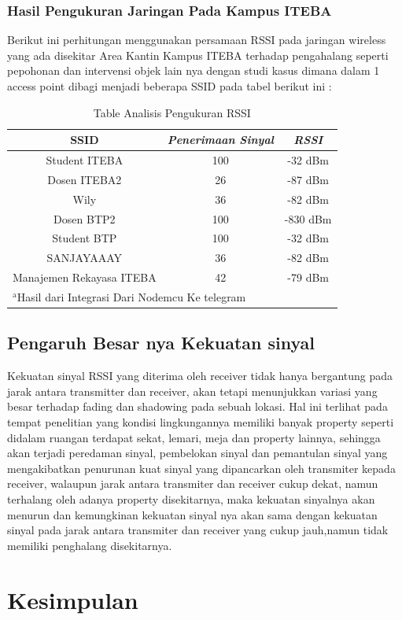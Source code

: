 \documentclass[conference]{IEEEtran}
\begin{document}
    \subsubsection{Hasil Pengukuran Jaringan Pada Kampus ITEBA}
    Berikut ini perhitungan menggunakan persamaan RSSI 
pada jaringan wireless yang ada disekitar Area Kantin Kampus ITEBA 
 terhadap pengahalang seperti pepohonan dan intervensi objek lain nya dengan studi kasus dimana dalam 1 access
 point dibagi menjadi beberapa SSID pada tabel berikut ini : 

 \begin{table}[htbp]
    \caption{Table Analisis Pengukuran RSSI}
    \begin{center}
    \begin{tabular}{|c|c|c|}
        \hline
    \textbf{SSID} &  \textbf{\textit{Penerimaan Sinyal}}& \textbf{\textit{RSSI}} \\
    \hline
    Student ITEBA & 100 & -32 dBm   \\
    \hline
    Dosen ITEBA2 & 26 & -87 dBm   \\
    \hline
    Wily & 36 & -82 dBm   \\
    \hline
    Dosen BTP2  & 100 & -830 dBm   \\
    \hline
    Student BTP  & 100 & -32 dBm   \\
    \hline
    SANJAYAAAY   & 36 & -82 dBm   \\
    \hline
    Manajemen Rekayasa ITEBA  & 42 & -79 dBm   \\
    \hline

    \multicolumn{3}{l}{$^{\mathrm{a}}$Hasil dari Integrasi Dari Nodemcu Ke telegram}
    \end{tabular}
    \label{tab1}
    \end{center}
    \end{table}


\subsection{Pengaruh Besar nya Kekuatan sinyal}
Kekuatan sinyal RSSI yang diterima oleh
receiver tidak hanya bergantung pada jarak
antara transmitter dan receiver, akan tetapi
menunjukkan variasi yang besar terhadap fading
dan shadowing pada sebuah lokasi. Hal ini
terlihat pada tempat penelitian yang kondisi
lingkungannya memiliki banyak property seperti
didalam ruangan terdapat sekat, lemari, meja dan
property lainnya, sehingga akan terjadi peredaman sinyal, 
pembelokan sinyal dan pemantulan
sinyal yang mengakibatkan penurunan kuat
sinyal yang dipancarkan oleh transmiter kepada
receiver, walaupun jarak antara transmiter dan
receiver cukup dekat, namun terhalang oleh
adanya property disekitarnya, maka kekuatan
sinyalnya akan menurun dan kemungkinan
kekuatan sinyal nya akan sama dengan kekuatan
sinyal pada jarak antara transmiter dan receiver
yang cukup jauh,namun tidak memiliki
penghalang disekitarnya.

\section{Kesimpulan}

% 
% 
\end{document}
